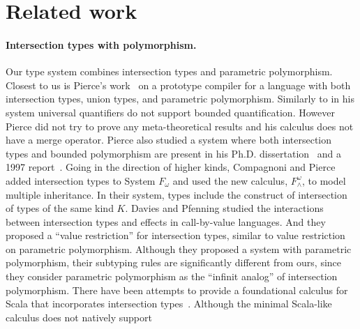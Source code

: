 \section{Related work} \label{sec:related-work}






\paragraph{Intersection types with polymorphism.}
Our type system combines intersection types and parametric polymorphism. Closest
to us is Pierce's work~\cite{pierce1991programming1} on a prototype
compiler for a language with both intersection types, union types, and
parametric polymorphism. Similarly to \name in his system universal
quantifiers do not support bounded quantification. However Pierce did not try to prove any
meta-theoretical results and his calculus does not have a merge
operator.  Pierce also studied a system where both intersection
types and bounded polymorphism are present in his Ph.D.
dissertation~\cite{pierce1991programming2} and a 1997
report~\cite{pierce1997intersection}. Going in the direction of higher
kinds, Compagnoni and Pierce~\cite{compagnoni1996higher} added
intersection types to System $ F_{\omega} $ and used the new calculus,
$ F^{\omega}_{\wedge} $, to model multiple inheritance. In their
system, types include the construct of intersection of types of the
same kind $ K $. Davies and Pfenning
\cite{davies2000intersection} studied the interactions between
intersection types and effects in call-by-value languages. And they
proposed a ``value restriction'' for intersection types, similar to
value restriction on parametric polymorphism. Although they proposed a system with
parametric polymorphism, their subtyping rules are significantly different from ours,
since they consider parametric polymorphism
as the ``infinit analog'' of intersection polymorphism.
There have been attempts to provide a foundational calculus
for Scala that incorporates intersection
types~\cite{amin2014foundations,amin2012dependent}.
Although the minimal Scala-like calculus does not natively support
